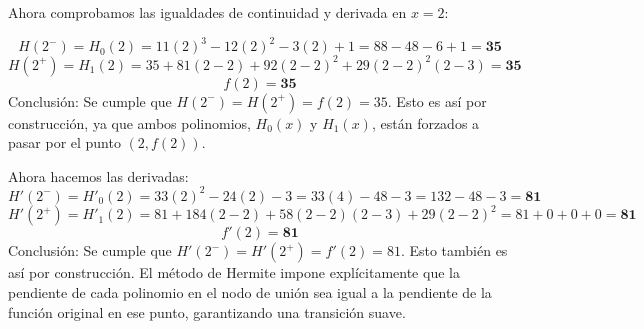 \documentclass{article}
\begin{document}
Ahora comprobamos las igualdades de continuidad y derivada en \(x=2\):

$$ H(2^-) = H_0(2) = 11(2)^3 - 12(2)^2 - 3(2) + 1  = 88 - 48 - 6 + 1 = \mathbf{35} $$
$$ H(2^+) = H_1(2) = 35 + 81(2-2) + 92(2-2)^2 + 29(2-2)^2(2-3) =  \mathbf{35} $$
$$ f(2) = \mathbf{35} $$
Conclusión: Se cumple que \(H(2^-) = H(2^+) = f(2) = 35\). Esto es así por construcción, ya que ambos polinomios, \(H_0(x)\) y \(H_1(x)\), están forzados a pasar por el punto \((2, f(2))\).

Ahora hacemos las derivadas:
$$ H'(2^-) = H'_0(2) = 33(2)^2 - 24(2) - 3 = 33(4) - 48 - 3 = 132 - 48 - 3 = \mathbf{81} $$
$$ H'(2^+) = H'_1(2) = 81 + 184(2-2) + 58(2-2)(2-3) + 29(2-2)^2 = 81 + 0 + 0 + 0 = \mathbf{81} $$
$$ f'(2) = \mathbf{81} $$
Conclusión: Se cumple que \(H'(2^-) = H'(2^+) = f'(2) = 81\). Esto también es así por construcción. El método de Hermite impone explícitamente que la pendiente de cada polinomio en el nodo de unión sea igual a la pendiente de la función original en ese punto, garantizando una transición suave.

\end{document}
